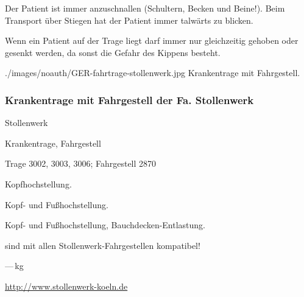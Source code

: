 {
Der Patient ist immer anzuschnallen (Schultern, Becken und Beine!). Beim
Transport über Stiegen hat der Patient immer talwärts zu blicken. 

Wenn ein Patient auf der Trage liegt darf immer nur  gleichzeitig
gehoben oder gesenkt werden, da sonst die Gefahr des Kippens besteht. 

}{

}
{./images/noauth/GER-fahrtrage-stollenwerk.jpg}
{Krankentrage mit Fahrgestell.}
{}

\subsubsection{Krankentrage mit Fahrgestell der Fa. Stollenwerk}





{%
\begin{compactdesc}
    \item[Hersteller:] Stollenwerk
    \item[Produktfamilie:] Krankentrage, Fahrgestell
    \item[Modell/Typ:] Trage 3002, 3003, 3006; Fahrgestell 2870
    \item[Modellbesonderheiten:] \begin{inparadesc}
    \item[Trage 3002:] Kopfhochstellung. 
    \item[Trage 3003:] Kopf- und Fußhochstellung. 
    \item[Trage 3006:] Kopf- und Fußhochstellung, Bauchdecken-Entlastung. 
    \item[Alle Tragen:] sind mit allen Stollenwerk-Fahrgestellen kompatibel!
\end{inparadesc}   
    \item[Max. Belastbarkeit:] ---\,kg
    \item[Homepage:] \url{http://www.stollenwerk-koeln.de}
\end{compactdesc}
{\TakeNotesLarge}
}{}{}{}{}

